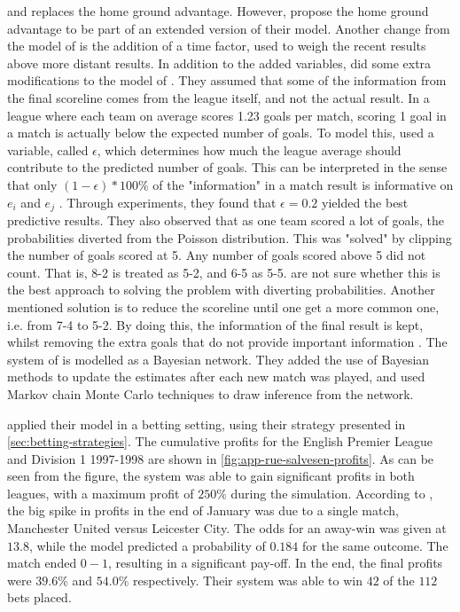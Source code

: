 and replaces the home ground advantage. However, \citet{bib:rue-salvesen-2000} propose the home ground advantage to be part of an extended version of their model. Another change from the model of \citet{bib:maher-1982} is the addition of a time factor, used to weigh the recent results above more distant results. In addition to the added variables, \citet{bib:rue-salvesen-2000} did some extra modifications to the model of \citet{bib:maher-1982}. They assumed that some of the information from the final scoreline comes from the league itself, and not the actual result. In a league where each team on average scores 1.23 goals per match, scoring 1 goal in a match is actually below the expected number of goals. To model this, \citet{bib:rue-salvesen-2000} used a variable, called $\epsilon$, which determines how much the league average should contribute to the predicted number of goals. This can be interpreted in the sense that only $(1 - \epsilon) * 100\%$ of the "information" in a match result is informative on $e_{i}$ and $e_{j}$ \citep{bib:rue-salvesen-2000}. Through experiments, they found that $\epsilon = 0.2$ yielded the best predictive results. They also observed that as one team scored a lot of goals, the probabilities diverted from the Poisson distribution. This was "solved" by clipping the number of goals scored at 5. Any number of goals scored above 5 did not count. That is, 8-2 is treated as 5-2, and 6-5 as 5-5. \citet{bib:rue-salvesen-2000} are not sure whether this is the best approach to solving the problem with diverting probabilities. Another mentioned solution is to reduce the scoreline until one get a more common one, i.e. from 7-4 to 5-2. By doing this, the information of the final result is kept, whilst removing the extra goals that do not provide important information \citep{bib:rue-salvesen-2000}. The system of \citet{bib:rue-salvesen-2000} is modelled as a Bayesian network. They added the use of Bayesian methods to update the estimates after each new match was played, and used Markov chain Monte Carlo techniques to draw inference from the network.

\citet{bib:rue-salvesen-2000} applied their model in a betting setting, using their strategy presented in \cref{sec:betting-strategies}. The cumulative profits for the English Premier League and Division 1 1997-1998 are shown in \cref{fig:app-rue-salvesen-profits}. As can be seen from the figure, the system was able to gain significant profits in both leagues, with a maximum profit of $250\%$ during the simulation. According to \citet{bib:rue-salvesen-2000}, the big spike in profits in the end of January was due to a single match, Manchester United versus Leicester City. The odds for an away-win was given at $13.8$, while the model predicted a probability of $0.184$ for the same outcome. The match ended $0-1$, resulting in a significant pay-off. In the end, the final profits were $39.6\%$ and $54.0\%$ respectively. Their system was able to win $42$ of the $112$ bets placed.

